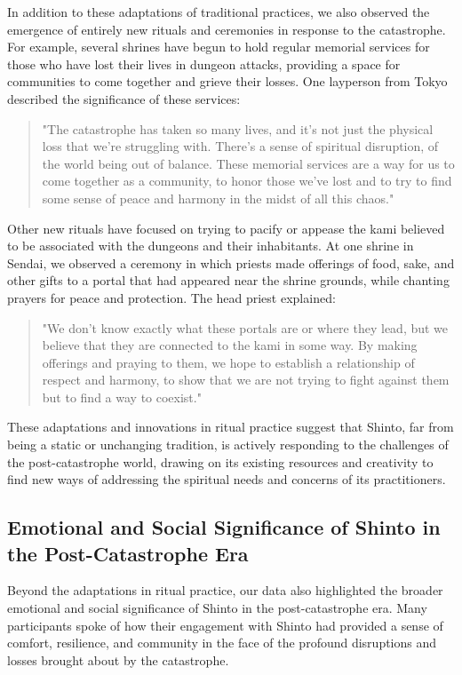 \documentclass[12pt, a4paper]{article}
\begin{document}
In addition to these adaptations of traditional practices, we also observed the emergence of entirely new rituals and ceremonies in response to the catastrophe. For example, several shrines have begun to hold regular memorial services for those who have lost their lives in dungeon attacks, providing a space for communities to come together and grieve their losses. One layperson from Tokyo described the significance of these services:

\begin{quote}
"The catastrophe has taken so many lives, and it's not just the physical loss that we're struggling with. There's a sense of spiritual disruption, of the world being out of balance. These memorial services are a way for us to come together as a community, to honor those we've lost and to try to find some sense of peace and harmony in the midst of all this chaos."
\end{quote}

Other new rituals have focused on trying to pacify or appease the kami believed to be associated with the dungeons and their inhabitants. At one shrine in Sendai, we observed a ceremony in which priests made offerings of food, sake, and other gifts to a portal that had appeared near the shrine grounds, while chanting prayers for peace and protection. The head priest explained:

\begin{quote}
"We don't know exactly what these portals are or where they lead, but we believe that they are connected to the kami in some way. By making offerings and praying to them, we hope to establish a relationship of respect and harmony, to show that we are not trying to fight against them but to find a way to coexist."
\end{quote}

These adaptations and innovations in ritual practice suggest that Shinto, far from being a static or unchanging tradition, is actively responding to the challenges of the post-catastrophe world, drawing on its existing resources and creativity to find new ways of addressing the spiritual needs and concerns of its practitioners.

\subsection{Emotional and Social Significance of Shinto in the Post-Catastrophe Era}
Beyond the adaptations in ritual practice, our data also highlighted the broader emotional and social significance of Shinto in the post-catastrophe era. Many participants spoke of how their engagement with Shinto had provided a sense of comfort, resilience, and community in the face of the profound disruptions and losses brought about by the catastrophe.
\end{document}
